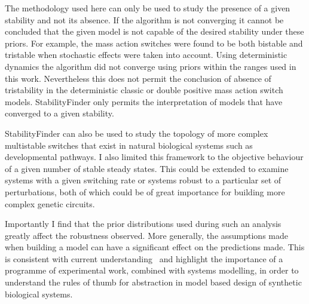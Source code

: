 
The methodology used here can only be used to study the presence of a given stability and not its absence. If the algorithm is not converging it cannot be concluded that the given model is not capable of the desired stability under these priors. For example, the mass action switches were found to be both bistable and tristable when stochastic effects were taken into account. Using deterministic dynamics the algorithm did not converge using priors within the ranges used in this work. Nevertheless this does not permit the conclusion of absence of tristability in the deterministic classic or double positive mass action switch models. StabilityFinder only permits the interpretation of models that have converged to a given stability. 




StabilityFinder can also be used to study the topology of more complex multistable switches that exist in natural biological systems such as developmental pathways. I also limited this framework to the objective behaviour of a given number of stable steady states. This could be extended to examine systems with a given switching rate or systems robust to a particular set of perturbations, both of which could be of great importance for building more complex genetic circuits.

Importantly I find that the prior distributions used during such an analysis greatly affect the robustness observed. More generally, the assumptions made when building a model can have a significant effect on the predictions made. This is consistent with current understanding~\autocite{Babtie:2014jg} and highlight the importance of a programme of experimental work, combined with systems modelling, in order to understand the rules of thumb for abstraction in model based design of synthetic biological systems.

